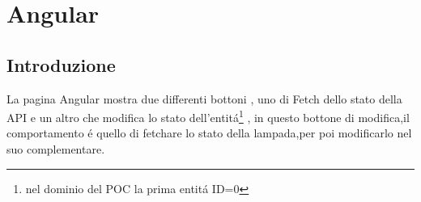 \chapter{Angular}\label{angular}

\section{Introduzione}

La pagina Angular mostra due differenti bottoni , uno di Fetch dello stato della API e un altro che modifica lo stato dell'entitá\footnote{nel dominio del POC la prima entitá ID=0} , in questo bottone di modifica,il comportamento é quello di fetchare lo stato della lampada,per poi modificarlo nel suo complementare.